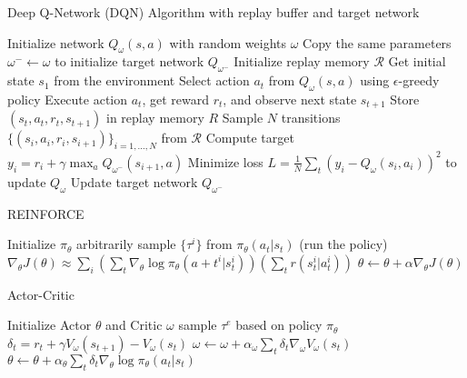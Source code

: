 \documentclass{article}
\begin{document}
\begin{algorithm}
\caption{Deep Q-Network (DQN) Algorithm with replay buffer and target network}
\label{alg:dqn}
\begin{algorithmic}[1]
\Require Initialize network $Q_{\omega}(s, a)$ with random weights $\omega$
\State Copy the same parameters $\omega^- \leftarrow \omega$ to initialize target network $Q_{\omega^-}$
\State Initialize replay memory $\mathcal R$
    \State Get initial state $s_1$ from the environment
        \State Select action $a_t$ from $Q_{\omega}(s, a)$ using $\epsilon$-greedy policy
        \State Execute action $a_t$, get reward $r_t$, and observe next state $s_{t+1}$
        \State Store $(s_t, a_t, r_t, s_{t+1})$ in replay memory $R$
        \State Sample $N$ transitions $\{(s_i, a_i, r_i, s_{i+1})\}_{i=1,\ldots,N}$ from $\mathcal R$
            \State Compute target $y_i = r_i + \gamma \max_a Q_{\omega^-}(s_{i+1}, a)$
        \EndFor
        \State Minimize loss $L = \frac{1}{N} \sum_t (y_i - Q_{\omega}(s_i, a_i))^2$ to update $Q_{\omega}$
        \State Update target network $Q_{\omega^-}$
    \EndFor
\EndFor
\end{algorithmic}
\end{algorithm}



\begin{algorithm}
\caption{REINFORCE}
\begin{algorithmic}[1]
\Require Initialize $\pi_\theta$ arbitrarily
\Repeat
    \State sample $\{\tau^i\}$ from $\pi_\theta(a_t | s_t)$ (run the policy)
    \State $\nabla_\theta J(\theta) \approx \sum_i (\sum_t \nabla_\theta \log \pi_\theta(a+t^i | s_t^i))(\sum_t r(s_t^i | a_t^i))$
    \State $\theta \gets \theta + \alpha \nabla_\theta J(\theta)$
\end{algorithmic}
\end{algorithm}




\begin{algorithm}
\caption{Actor-Critic}
\begin{algorithmic}[1]
\Require Initialize Actor $\theta$ and Critic $\omega$
    \State sample $\tau^e$ based on policy $\pi_\theta$
    \State $\delta_t = r_t + \gamma V_\omega(s_{t + 1}) - V_\omega(s_t)$
    \State $\omega \gets \omega + \alpha_\omega\sum_t\delta_t\nabla_\omega V_\omega(s_t)$
    \State $\theta \gets \theta + \alpha_\theta \sum_t\delta_t\nabla_\theta\log\pi_\theta(a_t | s_t)$
\EndFor
\end{algorithmic}
\end{algorithm}
\end{document}
